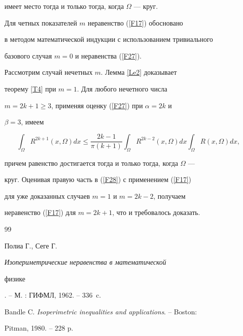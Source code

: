 {{имеет место тогда и только тогда, когда $\Omega$  --- круг}.





Для четных показателей $m$  неравенство (\ref{F17}) обосновано 


в \cite{l6} методом математической индукции с использованием тривиального 


базового случая $m=0$  и неравенства (\ref{F27}).





Рассмотрим случай нечетных $m$.  Лемма \ref{Le2} доказывает 


теорему \ref{T4} при $m=1$.   Для любого нечетного числа


$m=2k+1\geq 3$,   применяя оценку (\ref{F27}) при $\alpha=2k$  и


$\beta=3$, имеем


\begin{equation} \label{F28}


\int_\Omega R^{2k+1} (x,\Omega)dx


\leq \frac{2k-1}{\pi(k+1)}\int_\Omega R^{2k-2} (x,\Omega)dx


\int_\Omega R(x,\Omega)dx,


\end{equation}


причем равенство достигается тогда и только тогда, когда $\Omega$  --- 


круг. Оценивая правую часть в (\ref{F28}) с применением (\ref{F17}) 


для уже доказанных случаев $m=1$   и $m=2k-2$,  получаем


неравенство (\ref{F17}) для $m=2k+1$,  что и требовалось доказать.








\begin{thebibliography}{99}







Полиа Г., Сеге Г.  {\em Изопериметрические неравенства в математической 


физике}. -- М. : ГИФМЛ, 1962. -- 336~c.




Bandle C.  {\em Isoperimetric inequalities and applications}. -- Boston: 


Pitman, 1980. -- 228 p.



\end{thebibliography}}
